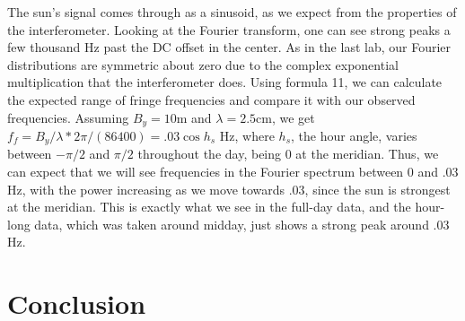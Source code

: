 \documentclass[11pt]{article}
\begin{document}
The sun's signal comes through as a sinusoid, as we expect from the properties of the interferometer. Looking at the Fourier transform, one can see strong peaks a few thousand Hz past the DC offset in the center. As in the last lab, our Fourier distributions are symmetric about zero due to the complex exponential multiplication that the interferometer does. Using formula 11, we can calculate the expected range of fringe frequencies and compare it with our observed frequencies. Assuming $B_y = 10$m and $\lambda = 2.5$cm, we get $f_f = B_y / \lambda * 2\pi / (86400) = .03\cos{h_s}$ Hz, where $h_s$, the hour angle, varies between $-\pi/2$ and $\pi/2$ throughout the day, being 0 at the meridian. Thus, we can expect that we will see frequencies in the Fourier spectrum between 0 and $.03$ Hz, with the power increasing as we move towards .03, since the sun is strongest at the meridian. This is exactly what we see in the full-day data, and the hour-long data, which was taken around midday, just shows a strong peak around .03 Hz. 





\section{Conclusion}

\end{document}
